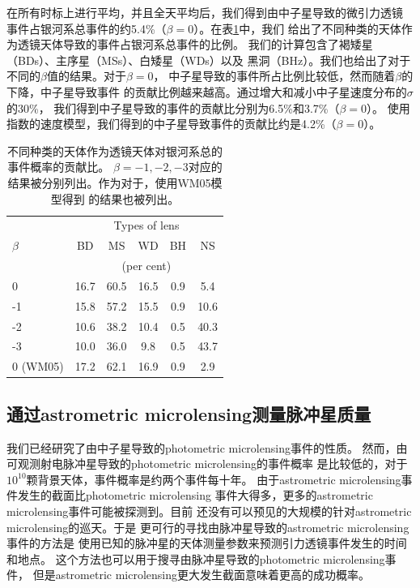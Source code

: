 在所有时标上进行平均，并且全天平均后，我们得到由中子星导致的微引力透镜
事件占银河系总事件的约5.4\%（$\beta=0$）。在表\ref{percent}中，我们
给出了不同种类的天体作为透镜天体导致的事件占银河系总事件的比例。
我们的计算包含了褐矮星（BDs）、主序星（MSs）、白矮星（WDs）以及
黑洞（BHz）。我们也给出了对于不同的$\beta$值的结果。对于$\beta=0$，
中子星导致的事件所占比例比较低，然而随着$\beta$的下降，中子星导致事件
的贡献比例越来越高。通过增大和减小中子星速度分布的$\sigma$的30\%，
我们得到中子星导致的事件的贡献比分别为6.5\%和3.7\%（$\beta=0$）。
使用指数的速度模型，我们得到的中子星导致事件的贡献比约是4.2\%（$\beta=0$）。
%
\begin{table}
\begin{center}
\caption{不同种类的天体作为透镜天体对银河系总的事件概率的贡献比。
$\beta=-1,-2,-3$对应的结果被分别列出。作为对于，使用WM05模型得到
的结果也被列出。}
\label{percent}
%
\begin{tabular}{lccccc}
\hline
             &       \multicolumn{5}{c}{Types of lens}      \\
$\beta$      & BD   &    MS    &    WD     &  BH   & NS     \\
             &       \multicolumn{5}{c}{(per cent)}         \\
\hline
0            & 16.7 &    60.5  &    16.5   &  0.9  & 5.4    \\
-1           & 15.8 &    57.2  &    15.5   &  0.9  & 10.6   \\        
-2           & 10.6 &    38.2  &    10.4   &  0.5  & 40.3   \\         
-3           & 10.0 &    36.0  &    9.8    &  0.5  & 43.7   \\            
0 (WM05)     & 17.2 &    62.1  &    16.9   &  0.9  & 2.9    \\
\hline
\end{tabular}
\end{center}
\end{table}
%
%

\subsection{通过astrometric microlensing测量脉冲星质量}

我们已经研究了由中子星导致的photometric microlensing事件的性质。
然而，由可观测射电脉冲星导致的photometric microlensing的事件概率
是比较低的，对于$10^{10}$颗背景天体，事件概率是约两个事件每十年。
由于astrometric microlensing事件发生的截面比photometric microlensing
事件大得多，更多的astrometric microlensing事件可能被探测到。目前
还没有可以预见的大规模的针对astrometric microlensing的巡天。于是
更可行的寻找由脉冲星导致的astrometric microlensing事件的方法是
使用已知的脉冲星的天体测量参数来预测引力透镜事件发生的时间和地点。
这个方法也可以用于搜寻由脉冲星导致的photometric microlensing事件，
但是astrometric microlensing更大发生截面意味着更高的成功概率。

